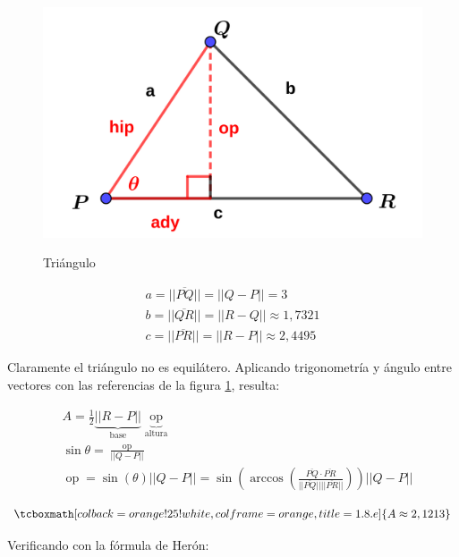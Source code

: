\documentclass{article}
\begin{document}
\begin{figure}[ht]
\caption{Triángulo}
\includegraphics[scale=0.8]{img/exercises/guide_01/08_e.png} 
\centering
\label{fig:1-8-e}
\end{figure}

\begin{subequations}
\begin{align}
a = ||\overline{PQ}|| = ||Q-P|| = 3 \\
b = ||\overline{QR}|| = ||R-Q|| \approx 1,7321 \\
c = ||\overline{PR}|| = ||R-P|| \approx 2,4495
\end{align}
\end{subequations}

Claramente el triángulo no es equilátero. Aplicando trigonometría y ángulo entre vectores con las referencias de la figura \ref{fig:1-8-e}, resulta:

\begin{subequations}
\begin{align}
& A = \frac{1}{2} \underbrace{||R-P||}_{\text{base}} \underbrace{ \mathop{op} }_{\text{altura}} \\
& \sin \theta = \frac{\mathop{op}}{||Q-P||} \\
& \mathop{op} = \sin (\theta) ||Q-P|| = \sin( \arccos \left( \frac{\overline{PQ} \cdot \overline{PR} }{||\overline{PQ}|| ||\overline{PR}||} \right) ) ||Q-P||
\end{align}
\end{subequations}

\begin{equation}
\tcboxmath[colback=orange!25!white,colframe=orange,title=1.8.e]
{ A \approx 2,1213 }
\end{equation}

Verificando con la fórmula de Herón:
\end{document}
